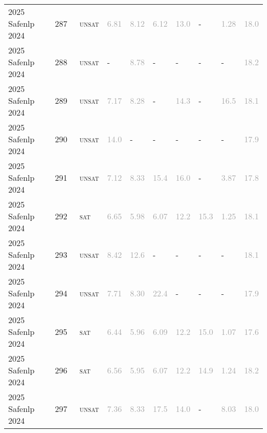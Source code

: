 \begin{center}
{\begin{longtable}{@{}llllllllll@{}}
2025 Safenlp 2024 & 287 & ~\textsc{unsat} & \textcolor{darkgray}{6.81} & \textcolor{darkgray}{8.12} & \textcolor{darkgray}{6.12} & \textcolor{darkgray}{13.0} & - & \textcolor{darkgray}{1.28} & \textcolor{darkgray}{18.0} \\
2025 Safenlp 2024 & 288 & ~\textsc{unsat} & - & \textcolor{darkgray}{8.78} & - & - & - & - & \textcolor{darkgray}{18.2} \\
2025 Safenlp 2024 & 289 & ~\textsc{unsat} & \textcolor{darkgray}{7.17} & \textcolor{darkgray}{8.28} & - & \textcolor{darkgray}{14.3} & - & \textcolor{darkgray}{16.5} & \textcolor{darkgray}{18.1} \\
2025 Safenlp 2024 & 290 & ~\textsc{unsat} & \textcolor{darkgray}{14.0} & - & - & - & - & - & \textcolor{darkgray}{17.9} \\
2025 Safenlp 2024 & 291 & ~\textsc{unsat} & \textcolor{darkgray}{7.12} & \textcolor{darkgray}{8.33} & \textcolor{darkgray}{15.4} & \textcolor{darkgray}{16.0} & - & \textcolor{darkgray}{3.87} & \textcolor{darkgray}{17.8} \\
2025 Safenlp 2024 & 292 & ~\textsc{sat} & \textcolor{darkgray}{6.65} & \textcolor{darkgray}{5.98} & \textcolor{darkgray}{6.07} & \textcolor{darkgray}{12.2} & \textcolor{darkgray}{15.3} & \textcolor{darkgray}{1.25} & \textcolor{darkgray}{18.1} \\
2025 Safenlp 2024 & 293 & ~\textsc{unsat} & \textcolor{darkgray}{8.42} & \textcolor{darkgray}{12.6} & - & - & - & - & \textcolor{darkgray}{18.1} \\
2025 Safenlp 2024 & 294 & ~\textsc{unsat} & \textcolor{darkgray}{7.71} & \textcolor{darkgray}{8.30} & \textcolor{darkgray}{22.4} & - & - & - & \textcolor{darkgray}{17.9} \\
2025 Safenlp 2024 & 295 & ~\textsc{sat} & \textcolor{darkgray}{6.44} & \textcolor{darkgray}{5.96} & \textcolor{darkgray}{6.09} & \textcolor{darkgray}{12.2} & \textcolor{darkgray}{15.0} & \textcolor{darkgray}{1.07} & \textcolor{darkgray}{17.6} \\
2025 Safenlp 2024 & 296 & ~\textsc{sat} & \textcolor{darkgray}{6.56} & \textcolor{darkgray}{5.95} & \textcolor{darkgray}{6.07} & \textcolor{darkgray}{12.2} & \textcolor{darkgray}{14.9} & \textcolor{darkgray}{1.24} & \textcolor{darkgray}{18.2} \\
2025 Safenlp 2024 & 297 & ~\textsc{unsat} & \textcolor{darkgray}{7.36} & \textcolor{darkgray}{8.33} & \textcolor{darkgray}{17.5} & \textcolor{darkgray}{14.0} & - & \textcolor{darkgray}{8.03} & \textcolor{darkgray}{18.0} \\

\end{longtable}}
\end{center}
